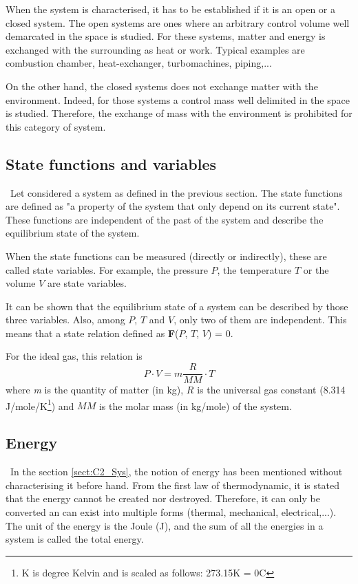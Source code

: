 When the system is characterised, it has to be established if it is an open or a closed system.
The open systems are ones where an arbitrary control volume well demarcated in the space is studied. For these systems, matter and energy is exchanged with the surrounding as heat or work. Typical examples are combustion chamber, heat-exchanger, turbomachines, piping,...

On the other hand, the closed systems does not exchange matter with the environment. Indeed, 
for those systems a control mass well delimited in the space is studied. Therefore, the exchange of mass with the environment is prohibited for this category of system. 

\subsection{State functions and variables}\label{sect:C2_State}
\quad\, Let considered a system as defined in the previous section. The state functions are defined as "a property of the system that only depend on its current state". These functions are independent of the past of the system and describe the equilibrium state of the system.

When the state functions can be measured (directly or indirectly), these are called state variables. For example, the pressure $P$, the temperature $T$ or the volume $V$ are state variables.

It can be shown that the equilibrium state of a system can be described by those three variables. Also, among $P$, $T$ and $V$, only two of them are independent. This means that a state relation defined as \textbf{F}($P$, $T$, $V$) = 0.

For the ideal gas, this relation is
\begin{equation}
P\cdot V = m\frac{R}{MM}\cdot T\label{eq:C2_GP}    
\end{equation}
where \textit{m} is the quantity of matter (in kg), $R$ is the universal gas constant (8.314 J/mole/K\footnote{K is degree Kelvin and is scaled as follows: 273.15\degree K = 0\degree C}) and $MM$ is the molar mass (in kg/mole) of the system.
\newpage
\subsection{Energy}\label{sect:C2_Ener}
\quad\, In the section \ref{sect:C2_Sys}, the notion of energy has been mentioned without characterising it before hand. From the first law of thermodynamic, it is stated that the energy cannot be created nor destroyed. Therefore, it can only be converted an can exist into multiple forms (thermal, mechanical, electrical,...)\cite{thermoApp_2}. The unit of the energy is the Joule (J), and the sum of all the energies in a system is called the total energy.


